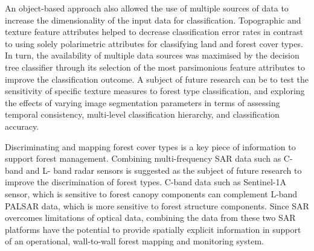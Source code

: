 An object-based approach also allowed the use of multiple sources of data to increase the dimensionality of the input data for classification. Topographic and texture feature attributes helped to decrease classification error rates in contrast to using solely polarimetric attributes for classifying land and forest cover types. In turn, the availability of multiple data sources was maximised by the decision tree classifier through its selection of the most parsimonious feature attributes to improve the classification outcome. A subject of future research can be to test the sensitivity of specific texture measures to forest type classification, and exploring the effects of varying image segmentation parameters in terms of assessing temporal consistency, multi-level classification hierarchy, and classification accuracy.

Discriminating and mapping forest cover types is a key piece of information to support forest management. Combining multi-frequency SAR data such as C-band and L- band radar sensors is suggested as the subject of future research to improve the discrimination of forest types. C-band data such as Sentinel-1A sensor, which is sensitive to forest canopy components can complement L-band PALSAR data, which is more sensitive to forest structure components. Since SAR overcomes limitations of optical data, combining the data from these two SAR platforms have the potential to provide spatially explicit information in support of an operational, wall-to-wall forest mapping and monitoring system.
